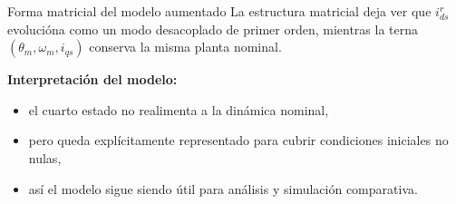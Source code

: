 \documentclass[aspectratio=169,t]{beamer}
\begin{document}
\begin{frame}{Forma matricial del modelo aumentado}
{\small\color{uncGray}La estructura matricial deja ver que $i_{ds}^{r}$ evolucióna como un modo desacoplado de primer orden, mientras la terna $(\theta_m,\omega_m,i_{qs})$ conserva la misma planta nominal.}\par
\vspace{2mm}

\centering
{}

\textbf{Interpretación del modelo:}
\begin{itemize}
  \item el cuarto estado no realimenta a la dinámica nominal,
  \item pero queda explícitamente representado para cubrir condiciones iniciales no nulas,
  \item así el modelo sigue siendo útil para análisis y simulación comparativa.
\end{itemize}
\end{frame}
\end{document}

